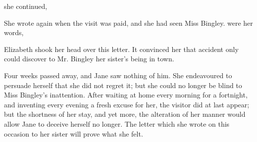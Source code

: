  she continued, 

She wrote again when the visit was paid, and she had seen Miss Bingley.  were her words, 

Elizabeth shook her head over this letter. It convinced her that accident only could discover to Mr. Bingley her sister's being in town.

Four weeks passed away, and Jane saw nothing of him. She endeavoured to persuade herself that she did not regret it; but she could no longer be blind to Miss Bingley's inattention. After waiting at home every morning for a fortnight, and inventing every evening a fresh excuse for her, the visitor did at last appear; but the shortness of her stay, and yet more, the alteration of her manner would allow Jane to deceive herself no longer. The letter which she wrote on this occasion to her sister will prove what she felt.

